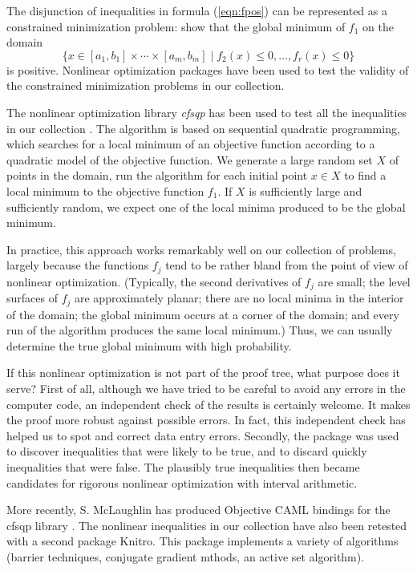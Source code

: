 The disjunction of inequalities in formula (\ref{eqn:fpos}) can
be represented as a constrained minimization problem: show that
the global minimum of $f_1$ on the domain
$$
\{x\in[a_1,b_1]\times\cdots\times[a_m,b_m] \mid  f_2(x)\le 0,\ldots,
  f_r(x)\le 0 \}
$$
is positive. Nonlinear optimization packages have been
used to test the validity of the constrained minimization
problems in our collection.

The nonlinear optimization library {\it cfsqp} has been used to
test all the inequalities in our collection \cite{cfsqp}.  
The algorithm
is based on sequential quadratic programming, which
searches for a local minimum of an objective function
according to a quadratic model of the objective
function.  We generate a large random set $X$ of points in the
domain, run the algorithm for each initial point $x\in X$ to
find a local minimum to the objective function $f_1$.  If $X$
is sufficiently large and sufficiently random, we expect one
of the local minima produced to be the  global minimum.

In practice, this approach works remarkably well on our
collection of problems, largely because the functions $f_j$
tend to be rather bland from the point of view of nonlinear
optimization.  (Typically, the second derivatives of $f_j$
are small; the level surfaces of $f_j$ are approximately planar;
there are no local minima in the interior of the domain;
the global minimum occurs at a corner of the domain; and
every run of the algorithm produces the same local minimum.)
Thus, we can usually determine the true global minimum with
high probability.


If this nonlinear optimization is not part of the proof tree,
what purpose does it serve? First of all, although we have
tried to be careful to avoid any errors in the computer code,
an independent check of the results is certainly welcome.
It makes the proof more robust against possible errors.  
In fact,
this independent check has helped us to spot and correct 
 data entry errors.  Secondly, the package was used to discover
inequalities that were likely to be true, and to discard quickly
inequalities that were false.  The plausibly true inequalities
then became candidates for  rigorous nonlinear optimization
with interval arithmetic.

More recently, 
S. McLaughlin has produced Objective CAML bindings for the
cfsqp library \cite{McLp}.  The nonlinear inequalities in our
collection have also been retested with a second package
Knitro.  This package implements a variety of algorithms
(barrier techniques, conjugate gradient mthods, an active set algorithm).



